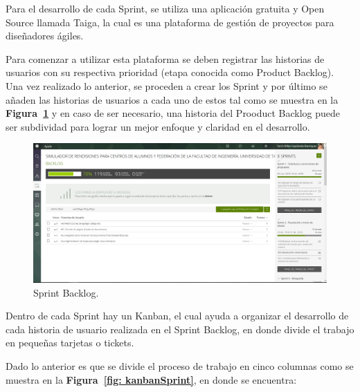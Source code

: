 Para el desarrollo de cada Sprint, se utiliza una aplicación gratuita y Open Source llamada Taiga, la cual es una plataforma de gestión de proyectos para diseñadores ágiles.

Para comenzar a utilizar esta plataforma se deben registrar las historias de usuarios con su respectiva prioridad (etapa conocida como Product Backlog). Una vez realizado lo anterior, se proceden a crear los Sprint y por último se añaden las historias de usuarios a cada uno de estos tal como se muestra en la \textbf{Figura~\ref{fig: SprintBacklog}} y en caso de ser necesario, una historia del Prooduct Backlog puede ser subdividad para lograr un mejor enfoque y claridad en el desarrollo.

\begin{figure}[h!]
    \includegraphics[width=\textwidth]{Imagenes/SprintBacklog.png}
    \caption{\label{fig: SprintBacklog} Sprint Backlog.}
\end{figure}

Dentro de cada Sprint hay un Kanban, el cual ayuda a organizar el desarrollo de cada historia de usuario realizada en el Sprint Backlog, en donde divide el trabajo en pequeñas tarjetas o tickets.

Dado lo anterior es que se divide el proceso de trabajo en cinco columnas como se muestra en la \textbf{Figura~\ref{fig: kanbanSprint}}, en donde se encuentra:

